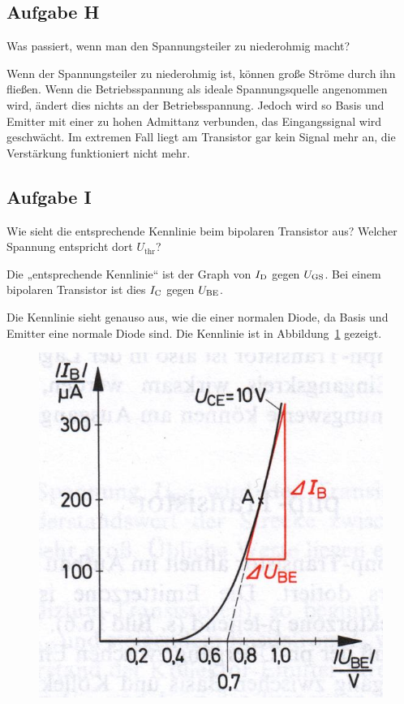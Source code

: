 \FloatBarrier
\subsection{Aufgabe H}

\begin{problem}
	Was passiert, wenn man den Spannungsteiler zu niederohmig macht?
\end{problem}

Wenn der Spannungsteiler zu niederohmig ist, können große Ströme durch ihn
fließen. Wenn die Betriebsspannung als ideale Spannungsquelle angenommen wird,
ändert dies nichts an der Betriebsspannung. Jedoch wird so Basis und Emitter
mit einer zu hohen Admittanz verbunden, das Eingangssignal wird geschwächt. Im
extremen Fall liegt am Transistor gar kein Signal mehr an, die Verstärkung
funktioniert nicht mehr.

\FloatBarrier
\subsection{Aufgabe I}

\begin{problem}
	Wie sieht die entsprechende Kennlinie beim bipolaren Transistor aus?
	Welcher Spannung entspricht dort $U_\text{thr}$?
\end{problem}

Die „entsprechende Kennlinie“ ist der Graph von $I_\text{D}$ gegen $U_\text{GS}$. Bei einem
bipolaren Transistor ist dies $I_\text{C}$ gegen $U_\text{BE}$.

Die Kennlinie sieht genauso aus, wie die einer normalen Diode, da Basis und
Emitter eine normale Diode sind. Die Kennlinie ist in
Abbildung~\ref{fig:beuth-bild-16-9} gezeigt.

\begin{figure}[htbp]
	\centering
	\includegraphics[width=.5\textwidth]{beuth-bild-16-9.jpg}
	\caption{%
		\cite[Bild~16.9]{beuth/elementare_elektronik}
	}
	\label{fig:beuth-bild-16-9}
\end{figure}

